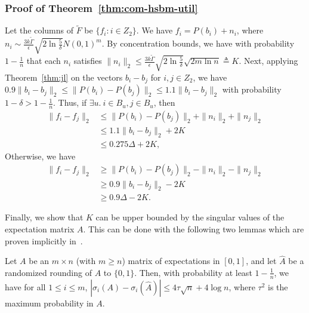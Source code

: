 \subsubsection{Proof of Theorem~\ref{thm:com-hsbm-util}}
Let the columns of $\tilde{F}$ be $\{f_i : i \in Z_2 \}$.
We have $f_i = P(b_i) + n_i$, where $n_i \sim \frac{3k \tilde{\Gamma}}{\epsilon} \sqrt{2\ln \frac{5}{\delta}}N(0,1)^{m}$. By concentration bounds, we have with probability $1-\frac{1}{n}$ that each $n_i$ satisfies $\|n_i\|_2 \leq \frac{3k\tilde{\Gamma}}{\epsilon}\sqrt{2\ln \frac{5}{\delta}} \sqrt{2m \ln n} \triangleq K$. Next, applying Theorem~\ref{thm:jl} on the vectors $b_i - b_j$ for $i,j \in Z_2$, we have $0.9 \|b_i - b_j\|_2 \leq \|P(b_i) - P(b_j)\|_2 \leq 1.1 \|b_i - b_j\|_2$ with probability $1-\delta > 1-\frac{1}{n}$. Thus, if $\exists u.~ i \in B_u, j \in B_u$, then
\begin{align*}
    \|f_i - f_j\|_2 &\leq \|P(b_i) - P(b_j)\|_2 + \|n_i\|_2 + \|n_j\|_2 \\
    &\leq 1.1 \|b_i - b_j\|_2 + 2K \\
    &\leq 0.275 \Delta + 2K,
\end{align*}
Otherwise, we have
\begin{align*}
    \|f_i - f_j\|_2 &\geq \|P(b_i) - P(b_j)\|_2 - \|n_i\|_2 - \|n_j\|_2 \\
    &\geq 0.9 \|b_i - b_j\|_2 - 2K \\
    &\geq0.9\Delta - 2K.
\end{align*}


Finally, we show that $K$ can be upper bounded by the singular values of the expectation matrix $A$. This can be done with the following two lemmas which are proven implicitly in~\citet{vu2014simple}.
\begin{lem}\label{lem:rand-mat-sv}
Let $A$ be an $m \times n$ (with $m \geq n$) matrix of expectations in $[0,1]$, and let $\hat{A}$ be a randomized rounding of $A$ to $\{0,1\}$. Then, with probability at least $1 - \frac{1}{n}$, we have for all $1 \leq i \leq m$, $|\sigma_i(A) - \sigma_i(\hat{A})| \leq 4\tau \sqrt{n} + 4 \log n$, where $\tau^2$ is the maximum probability in $A$.
\end{lem}

